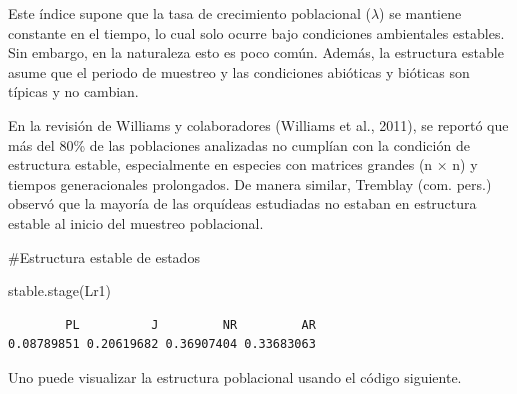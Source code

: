\documentclass[
  12pt,
  letterpaper,
]{book}
\newenvironment{Shaded}{\begin{snugshade}}{\end{snugshade}}
\newcommand{\CommentTok}[1]{\textcolor[rgb]{0.37,0.37,0.37}{#1}}
\newcommand{\FunctionTok}[1]{\textcolor[rgb]{0.28,0.35,0.67}{#1}}
\newcommand{\NormalTok}[1]{\textcolor[rgb]{0.00,0.23,0.31}{#1}}
\begin{document}
Este índice supone que la tasa de crecimiento poblacional (\(\lambda\))
se mantiene constante en el tiempo, lo cual solo ocurre bajo condiciones
ambientales estables. Sin embargo, en la naturaleza esto es poco común.
Además, la estructura estable asume que el periodo de muestreo y las
condiciones abióticas y bióticas son típicas y no cambian.

En la revisión de Williams y colaboradores (Williams et al., 2011), se
reportó que más del 80\% de las poblaciones analizadas no cumplían con
la condición de estructura estable, especialmente en especies con
matrices grandes (n × n) y tiempos generacionales prolongados. De manera
similar, Tremblay (com. pers.) observó que la mayoría de las orquídeas
estudiadas no estaban en estructura estable al inicio del muestreo
poblacional.

\begin{Shaded}
\begin{Highlighting}[]
\CommentTok{\#Estructura estable de estados}

\FunctionTok{stable.stage}\NormalTok{(Lr1)}
\end{Highlighting}
\end{Shaded}

\begin{verbatim}
        PL          J         NR         AR 
0.08789851 0.20619682 0.36907404 0.33683063 
\end{verbatim}

Uno puede visualizar la estructura poblacional usando el código
siguiente.
\end{document}

